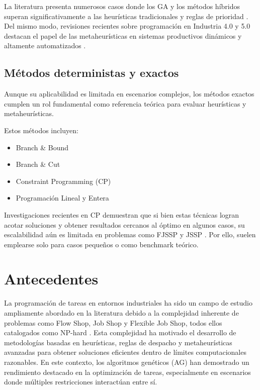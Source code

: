 La literatura presenta numerosos casos donde los GA y los métodos híbridos superan significativamente a las heurísticas tradicionales y reglas de prioridad \cite{meisel2010,flowshop}. Del mismo modo, revisiones recientes sobre programación en Industria 4.0 y 5.0 destacan el papel de las metaheurísticas en sistemas productivos dinámicos y altamente automatizados \cite{industry4}.

\subsection{Métodos deterministas y exactos}
Aunque su aplicabilidad es limitada en escenarios complejos, los métodos exactos cumplen un rol fundamental como referencia teórica para evaluar heurísticas y metaheurísticas.

Estos métodos incluyen:
\begin{itemize}
    \item Branch \& Bound
    \item Branch \& Cut
    \item Constraint Programming (CP)
    \item Programación Lineal y Entera
\end{itemize}

Investigaciones recientes en CP demuestran que si bien estas técnicas logran acotar soluciones y obtener resultados cercanos al óptimo en algunos casos, su escalabilidad aún es limitada en problemas como FJSSP y JSSP \cite{teppan2022}. Por ello, suelen emplearse solo para casos pequeños o como benchmark teórico.

\section{Antecedentes}

La programación de tareas en entornos industriales ha sido un campo de estudio ampliamente abordado 
en la literatura debido a la complejidad inherente de problemas como Flow Shop, Job Shop y Flexible 
Job Shop, todos ellos catalogados como NP-hard \cite{flowshop,flexjobshop}. Esta complejidad ha 
motivado el desarrollo de metodologías basadas en heurísticas, reglas de despacho y metaheurísticas 
avanzadas para obtener soluciones eficientes dentro de límites computacionales razonables. En este 
contexto, los algoritmos genéticos (AG) han demostrado un rendimiento destacado en la optimización 
de tareas, especialmente en escenarios donde múltiples restricciones interactúan entre sí.

